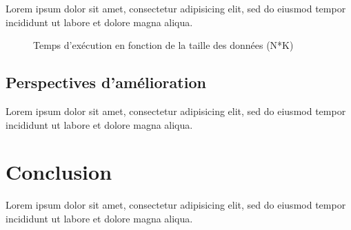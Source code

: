 \documentclass[12pt]{article}
\begin{document}
Lorem ipsum dolor sit amet, consectetur adipisicing elit, sed do eiusmod tempor
incididunt ut labore et dolore magna aliqua.

\begin{figure}
    \begin{center}
        \caption{Temps d'exécution en fonction de la taille des données (N*K)}
        \label{time-to-data-size}
    \end{center}
\end{figure}

\subsection{Perspectives d'amélioration}

Lorem ipsum dolor sit amet, consectetur adipisicing elit, sed do eiusmod tempor
incididunt ut labore et dolore magna aliqua.

\section{Conclusion}

Lorem ipsum dolor sit amet, consectetur adipisicing elit, sed do eiusmod tempor
incididunt ut labore et dolore magna aliqua.
\end{document}

